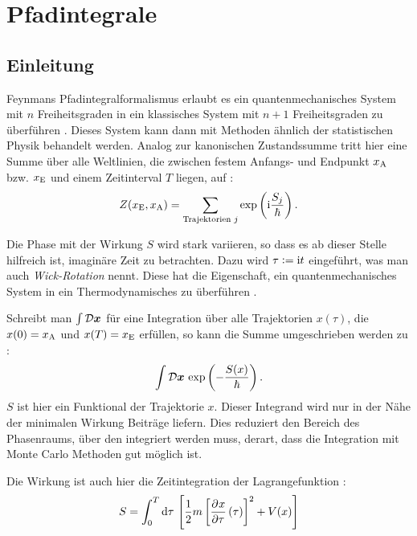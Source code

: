 
\chapter{Pfadintegrale}

\section{Einleitung}

Feynmans Pfadintegralformalismus erlaubt es ein quantenmechanisches System mit
$n$ Freiheitsgraden in ein klassisches System mit $n+1$ Freiheitsgraden zu
überführen \parencite[§12.4]{Thijssen/Computational_Physics}. Dieses System
kann dann mit Methoden ähnlich der statistischen Physik behandelt werden.
Analog zur kanonischen Zustandssumme tritt hier eine Summe über alle
Weltlinien, die zwischen festem Anfangs- und Endpunkt $x_\text A$ bzw. $x_\text
E$ und einem Zeitinterval $T$ liegen, auf
\parencite[(2.7)]{Creutz/Statistical_Approach_QM}:
\[
    Z(x_\text E, x_\text A) = \sum_{\text{Trajektorien $j$}} \exp\del{ \iup
    \frac{S_j}{\hbar}}.
\]

Die Phase mit der Wirkung $S$ wird stark variieren, so dass es ab dieser Stelle
hilfreich ist, imaginäre Zeit zu betrachten. Dazu wird $\tau := \mathrm i t$
eingeführt, was man auch \emph{Wick-Rotation} nennt. Diese hat die Eigenschaft,
ein quantenmechanisches System in ein Thermodynamisches zu überführen
\parencite[24]{Stetz/AQT}.

Schreibt man $\int \mathcal D \boldsymbol{x}$ für eine Integration über alle
Trajektorien $x(\tau)$, die $x(0) = x_\text A$ und $x(T) = x_\text E$ erfüllen,
so kann die Summe umgeschrieben werden zu
\parencite[(2.1)]{Creutz/Statistical_Approach_QM}:
\[
    \int \funcmeasure \, \exp\del{-\frac{S(x)}\hbar}.
\]
$S$ ist hier ein Funktional der Trajektorie $x$. Dieser Integrand wird nur in
der Nähe der minimalen Wirkung Beiträge liefern. Dies reduziert den Bereich des
Phasenraums, über den integriert werden muss, derart, dass die Integration mit
Monte Carlo Methoden gut möglich ist.

Die Wirkung ist auch hier die Zeitintegration der Lagrangefunktion
\parencite[(2.5)]{Creutz/Statistical_Approach_QM}:
\[
    S = \int_0^T \dif \tau \, \sbr{\frac 12 m \sbr{\dpd x\tau(\tau)}^2 + V(x)}
\]

